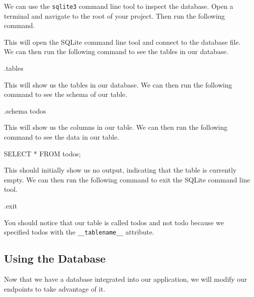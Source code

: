 \documentclass{csse4400}
\begin{document}

We can use the \texttt{sqlite3} command line tool to inspect the database.
Open a terminal and navigate to the root of your project.
Then run the following command.



This will open the SQLite command line tool and connect to the database file.
We can then run the following command to see the tables in our database.

\begin{code}[language=sql,numbers=none]{}
  .tables
\end{code}

This will show us the tables in our database.
We can then run the following command to see the schema of our table.

\begin{code}[language=sql,numbers=none]{}
  .schema todos
\end{code}

This will show us the columns in our table.
We can then run the following command to see the data in our table.

\begin{code}[language=sql,numbers=none]{}
  SELECT * FROM todos;
\end{code}

This should initially show us no output, indicating that the table is currently empty.
We can then run the following command to exit the SQLite command line tool.

\begin{code}[language=sql,numbers=none]{}
  .exit
\end{code}

You should notice that our table is called todos and not todo because we specified todos with the \texttt{\_\_tablename\_\_} attribute.


\subsection{Using the Database}

Now that we have a database integrated into our application,
we will modify our endpoints to take advantage of it. 
\end{document}
